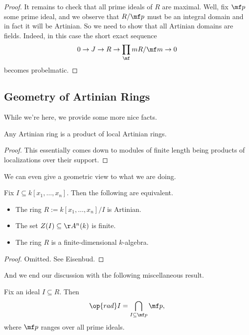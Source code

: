 \begin{proof}
	It remains to check that all prime ideals of $R$ are maximal. Well, fix $\mf p$ some prime ideal, and we observe that $R/\mf p$ must be an integral domain and in fact it will be Artinian. So we need to show that all Artinian domains are fields. Indeed, in this case the short exact sequence
	\[0\to J\to R\to\prod_\mf mR/\mf m\to0\]
	becomes probelmatic. %
\end{proof}

\subsection{Geometry of Artinian Rings}
While we're here, we provide some more nice facts.
\begin{proposition}
	Any Artinian ring is a product of local Artinian rings.
\end{proposition}
\begin{proof}
	This essentially comes down to modules of finite length being products of localizations over their support.
\end{proof}
We can even give a geometric view to what we are doing.
\begin{proposition}
	Fix $I\subseteq k[x_1,\ldots,x_n]$. Then the following are equivalent.
	\begin{itemize}
		\item The ring $R:=k[x_1,\ldots,x_n]/I$ is Artinian.
		\item The set $Z(I)\subseteq\AA^n(k)$ is finite.
		\item The ring $R$ is a finite-dimensional $k$-algebra.
	\end{itemize}
\end{proposition}
\begin{proof}
	Omitted. See Eisenbud.
\end{proof}
And we end our discussion with the following miscellaneous result.
\begin{proposition}
	Fix an ideal $I\subseteq R$. Then
	\[\op{rad}I=\bigcap_{I\subseteq\mf p}\mf p,\]
	where $\mf p$ ranges over all prime ideals.
\end{proposition}
